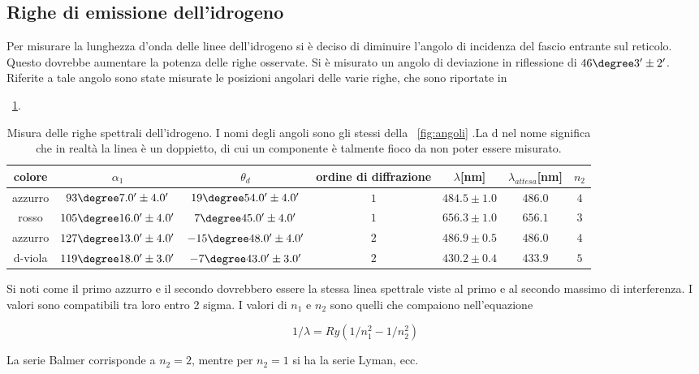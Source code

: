 \documentclass[a4paper,10pt]{article}
\begin{document}
{{{{{\subsection{Righe di emissione dell'idrogeno}

Per misurare la lunghezza d'onda delle linee dell'idrogeno si è deciso di diminuire l'angolo di incidenza del fascio entrante sul reticolo. Questo
dovrebbe aumentare la potenza delle righe osservate. Si è misurato un angolo di deviazione in riflessione di $46\degree 3' \pm 2'$. Riferite a tale angolo sono state misurate le posizioni angolari delle varie righe, che sono riportate in \tablename{~\ref{tab:HH}.

\begin{table}[H]
	\centering
	\begin{tabular}{c|c|c|c|c|c|c}
colore & $\alpha_1$ &	$\theta_d$ & ordine di diffrazione & $\lambda$[nm] & $\lambda_{attesa}$[nm]& $n_2$  \\
		\hline
azzurro &  $ 93\degree 7.0' \pm 4.0 ' $  &  $ 19\degree 54.0' \pm 4.0 ' $  &  $ 1 $ & $ 484.5 \pm 1.0 $ & $ 486.0 $ & $ 4 $\\
rosso &  $ 105\degree 16.0' \pm 4.0 ' $  &  $ 7\degree 45.0' \pm 4.0 ' $  &  $ 1 $ & $ 656.3 \pm 1.0 $ & $ 656.1 $ & $ 3 $\\
azzurro &  $ 127\degree 13.0' \pm 4.0 ' $  &  $ -15\degree 48.0' \pm 4.0 ' $  &  $ 2 $ & $ 486.9 \pm 0.5 $ & $ 486.0 $ & $ 4 $\\
d-viola &  $ 119\degree 18.0' \pm 3.0 ' $  &  $ -7\degree 43.0' \pm 3.0 ' $  &  $ 2 $ & $ 430.2 \pm 0.4 $ & $ 433.9 $ & $ 5 $\\
	\end{tabular}
	\caption{Misura delle righe spettrali dell'idrogeno. I nomi degli angoli sono gli stessi della \figurename{~\ref{fig:angoli} }.La d nel nome significa che in realtà la linea è un doppietto, di cui un componente è talmente fioco da non poter essere misurato.}
	\label{tab:HH}
\end{table}

Si noti come il primo azzurro e il secondo dovrebbero essere la stessa linea spettrale viste al primo e al secondo massimo di interferenza. I valori sono compatibili tra loro entro 2 sigma.
I valori di $n_1$ e $n_2$ sono quelli che compaiono nell'equazione

\begin{equation}
 1/\lambda=Ry(1/n_1^2-1/n_2^2)
\end{equation} 
 
La serie Balmer corrisponde a $n_2=2$, mentre per $n_2=1$ si ha la serie Lyman, ecc.	

}}}}}}
\end{document}
